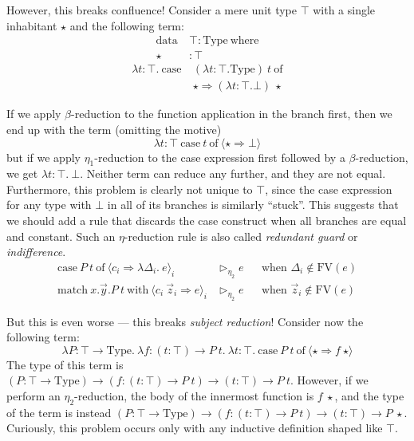 \documentclass{report}
\newcommand{\const}[1]{\text{#1}}
\newcommand{\meta}[1]{\text{#1}}
\newcommand{\data}{\const{data}}
\newcommand{\Type}{\const{Type}}
\newcommand{\where}{\const{where}}
\newcommand{\case}{\const{case}}
\newcommand{\of}{\const{of}}
\newcommand{\match}{\const{match}}
\newcommand{\with}{\const{with}}
\begin{document}
However, this breaks confluence! Consider a mere unit type $\top$ with a single inhabitant $\star$ and the following term:
%
\begin{align*}
    \data ~ &\top: \Type ~ \where \\
    \star &: \top
\end{align*}
\begin{align*}
    \lambda t: \top. ~ \case ~ &(\lambda t: \top. \Type) ~ t ~ \of \\
    &\star \Rightarrow (\lambda t: \top. \bot) ~ \star
\end{align*}

If we apply $\beta$-reduction to the function application in the branch first, then we end up with the term (omitting the motive) $$\lambda t: \top ~ \case ~ t ~ \of ~ \langle \star \Rightarrow \bot \rangle$$ but if we apply $\eta_1$-reduction to the case expression first followed by a $\beta$-reduction, we get $\lambda t: \top. ~ \bot$. Neither term can reduce any further, and they are not equal. Furthermore, this problem is clearly not unique to $\top$, since the case expression for any type with $\bot$ in all of its branches is similarly ``stuck''. This suggests that we should add a rule that discards the case construct when all branches are equal and constant. Such an $\eta$-reduction rule is also called \emph{redundant guard} or \emph{indifference}.
%
\begin{align*}
    \case ~ P ~ t ~ \of ~ \langle c_i \Rightarrow \lambda \Delta_i. ~ e \rangle_i &\rhd_{\eta_2} e && \text{when $\Delta_i \notin \meta{FV}(e)$} \\
    \match ~ x.\Vec{y}.P ~ t ~ \with ~ \langle c_i ~ \vec{z}_i \Rightarrow e \rangle_i &\rhd_{\eta_2} e && \text{when $\vec{z}_i \notin \meta{FV}(e)$}
\end{align*}

But this is even worse --- this breaks \emph{subject reduction}! Consider now the following term:
$$\lambda P: \top \to \Type. ~ \lambda f: (t: \top) \to P ~ t. ~ \lambda t: \top. ~ \case ~ P ~ t ~ \of ~ \langle \star \Rightarrow f ~ \star \rangle$$
The type of this term is $(P: \top \to \Type) \to (f: (t: \top) \to P ~ t) \to (t: \top) \to P ~ t$. However, if we perform an $\eta_2$-reduction, the body of the innermost function is $f ~ \star$, and the type of the term is instead $(P: \top \to \Type) \to (f: (t: \top) \to P ~ t) \to (t: \top) \to P ~ \star$. Curiously, this problem occurs only with any inductive definition shaped like $\top$.
\end{document}
